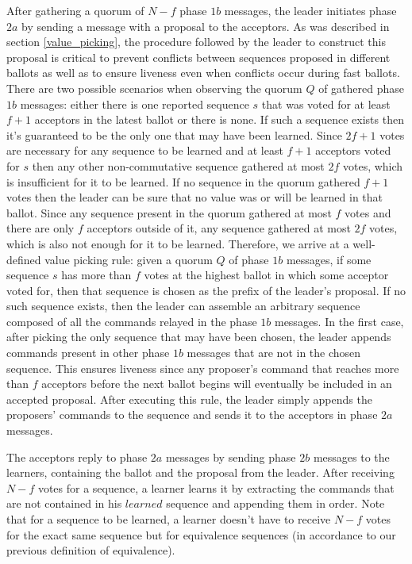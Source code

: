 After gathering a quorum of $N-f$ phase $1b$ messages, the leader initiates phase $2a$ by sending a message with a proposal to the acceptors. As was described in section \ref{value_picking}, the procedure followed by the leader to construct this proposal is critical to prevent conflicts between sequences proposed in different ballots as well as to ensure liveness even when conflicts occur during fast ballots. There are two possible scenarios when observing the quorum $Q$ of gathered phase $1b$ messages: either there is one reported sequence $s$ that was voted for at least $f+1$ acceptors in the latest ballot or there is none. If such a sequence exists then it's guaranteed to be the only one that may have been learned. Since $2f+1$ votes are necessary for any sequence to be learned and at least $f+1$ acceptors voted for $s$ then any other non-commutative sequence gathered at most $2f$ votes, which is insufficient for it to be learned. If no sequence in the quorum gathered $f+1$ votes then the leader can be sure that no value was or will be learned in that ballot. Since any sequence present in the quorum gathered at most $f$ votes and there are only $f$ acceptors outside of it, any sequence gathered at most $2f$ votes, which is also not enough for it to be learned. Therefore, we arrive at a well-defined value picking rule: given a quorum $Q$ of phase $1b$ messages, if some sequence $s$ has more than $f$ votes at the highest ballot in which some acceptor voted for, then that sequence is chosen as the prefix of the leader's proposal. If no such sequence exists, then the leader can assemble an arbitrary sequence composed of all the commands relayed in the phase $1b$ messages. In the first case, after picking the only sequence that may have been chosen, the leader appends commands present in other phase $1b$ messages that are not in the chosen sequence. This ensures liveness since any proposer's command that reaches more than $f$ acceptors before the next ballot begins will eventually be included in an accepted proposal. After executing this rule, the leader simply appends the proposers' commands to the sequence and sends it to the acceptors in phase $2a$ messages.\par

The acceptors reply to phase $2a$ messages by sending phase $2b$ messages to the learners, containing the ballot and the proposal from the leader. After receiving $N-f$ votes for a sequence, a learner learns it by extracting the commands that are not contained in his $learned$ sequence and appending them in order. Note that for a sequence to be learned, a learner doesn't have to receive $N-f$ votes for the exact same sequence but for equivalence sequences (in accordance to our previous definition of equivalence).

